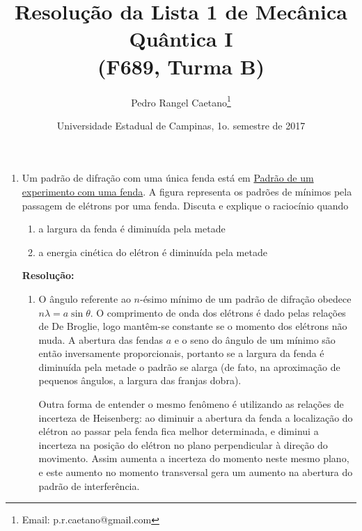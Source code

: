 \documentclass[a4paper, 12pt, notitlepage]{article}
\begin{document}
\title{Resolução da Lista 1 de Mecânica Quântica I\\ (F689, Turma B)}
\author{Pedro Rangel Caetano\footnote{Email: p.r.caetano@gmail.com}} 
\date{Universidade Estadual de Campinas, 1o. semestre de 2017}
\maketitle

\tableofcontents
\pagebreak

\begin{enumerate}

\item Um padrão de difração com uma única fenda está em \href{http://www.clemson.edu/ces/phoenix/labs/224/diffraction/fringes.jpg}{Padrão de um experimento com uma fenda}. A figura representa os padrões de mínimos pela passagem de elétrons por uma fenda. Discuta e explique o raciocínio quando

\begin{enumerate}
  \item a largura da fenda é diminuída pela metade
  
  \item a energia cinética do elétron é diminuída pela metade

\end{enumerate}

\textbf{Resolução: }
\begin{enumerate}

  \item O ângulo referente ao $n$-ésimo mínimo de um padrão de difração obedece $n \lambda = a \sin \theta$. O comprimento de onda dos elétrons é dado pelas relações de De Broglie, logo mantêm-se constante se o momento dos elétrons não muda. A abertura das fendas $a$ e o seno do ângulo de um mínimo são então inversamente proporcionais, portanto se a largura da fenda é diminuída pela metade o padrão se alarga (de fato, na aproximação de pequenos ângulos, a largura das franjas dobra).

  Outra forma de entender o mesmo fenômeno é utilizando as relações de incerteza de Heisenberg: ao diminuir a abertura da fenda a localização do elétron ao passar pela fenda fica melhor determinada, e diminui a incerteza na posição do elétron no plano perpendicular à direção do movimento. Assim aumenta a incerteza do momento neste mesmo plano, e este aumento no momento transversal gera um aumento na abertura do padrão de interferência.


\end{enumerate}
\end{enumerate}
\end{document}
